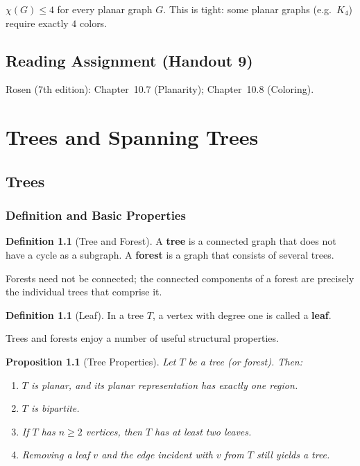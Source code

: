 \documentclass[11pt, a4paper, notitlepage]{report}
\newtheorem{proposition}[theorem]{Proposition}
\theoremstyle{definition}
\newtheorem{definition}[theorem]{Definition}
\theoremstyle{remark}
\begin{document}
\begin{keyresult}[title={Key Result: Four-Color Theorem}]
$\chi(G) \leq 4$ for every planar graph $G$. This is tight: some planar graphs (e.g.\ $K_4$) require exactly $4$ colors.
\end{keyresult}

\section*{Reading Assignment (Handout 9)}
Rosen (7th edition): Chapter~10.7 (Planarity); Chapter~10.8 (Coloring).

\chapter{Trees and Spanning Trees}
\label{chap:trees}

\section{Trees}
\label{sec:trees}

\subsection{Definition and Basic Properties}
\label{subsec:tree-def}

\begin{definition}[Tree and Forest]
\label{def:tree}
A \textbf{tree} is a connected graph that does not have a cycle as a subgraph.
A \textbf{forest} is a graph that consists of several trees.
\end{definition}

Forests need not be connected; the connected components of a forest are precisely the individual trees that comprise it.

\begin{definition}[Leaf]
\label{def:leaf}
In a tree $T$, a vertex with degree one is called a \textbf{leaf}.
\end{definition}

Trees and forests enjoy a number of useful structural properties.

\begin{proposition}[Tree Properties]
\label{prop:tree-properties}
Let $T$ be a tree (or forest). Then:
\begin{enumerate}[label=(\roman*)]
  \item $T$ is planar, and its planar representation has exactly one region.
  \item $T$ is bipartite.
  \item If $T$ has $n \geq 2$ vertices, then $T$ has at least two leaves.
  \item Removing a leaf $v$ and the edge incident with $v$ from $T$ still yields a tree.
\end{enumerate}
\end{proposition}
\end{document}
